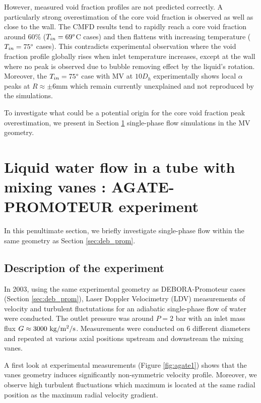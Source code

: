 However, measured void fraction profiles are not predicted correctly. A particularly strong overestimation of the core void fraction is observed as well as close to the wall. The CMFD results tend to rapidly reach a core void fraction around $60\%$ ($T_{in}=69\degree$C cases) and then flattens with increasing temperature ($T_{in}=75\degree$ cases). This contradicts experimental observation where the void fraction profile globally rises when inlet temperature increases, except at the wall where no peak is observed due to bubble removing effect by the liquid's rotation. Moreover, the $T_{in}=75\degree$ case with MV at $10D_{h}$ experimentally shows local $\alpha$ peaks at $R\approx \pm 6$mm which remain currently unexplained and not reproduced by the simulations. 

To investigate what could be a potential origin for the core void fraction peak overestimation, we present in Section \ref{sec:agate} single-phase flow simulations in the MV geometry.





\section{Liquid water flow in a tube with mixing vanes : AGATE-PROMOTEUR experiment}
\label{sec:agate}

In this penultimate section, we briefly investigate single-phase flow within the same geometry as Section \ref{sec:deb_prom}.

\subsection{Description of the experiment}

In 2003, using the same experimental geometry as DEBORA-Promoteur cases (Section \ref{sec:deb_prom}), Laser Doppler Velocimetry (LDV) measurements of velocity and turbulent fluctutations for an adiabatic single-phase flow of water were conducted. The outlet pressure was around $P=2$ bar with an inlet mass flux $G\approx 3000~\text{kg/m$^{2}$/s}$. Measurements were conducted on $6$ different diameters and repeated at various axial positions upstream and downstream the mixing vanes.

A first look at experimental measurements (Figure \ref{fig:agate1}) shows that the vanes geometry induces significantly non-symmetric velocity profile. Moreover, we observe high turbulent fluctuations which maximum is located at the same radial position as the maximum radial velocity gradient.

